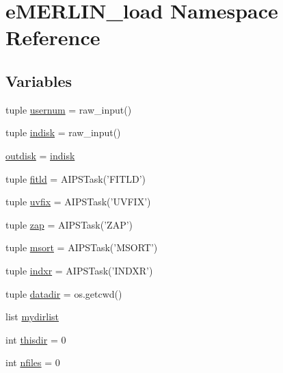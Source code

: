\hypertarget{namespacee_m_e_r_l_i_n__load}{\section{e\-M\-E\-R\-L\-I\-N\-\_\-load \-Namespace \-Reference}
\label{namespacee_m_e_r_l_i_n__load}
}
\subsection*{\-Variables}
\begin{DoxyCompactItemize}
\item 
tuple \hyperlink{namespacee_m_e_r_l_i_n__load_af02bbee7ea129998a2af5726d1838d88}{usernum} = raw\-\_\-input()
\item 
tuple \hyperlink{namespacee_m_e_r_l_i_n__load_af5dbb7c985275442e06db7e9c4d2ed57}{indisk} = raw\-\_\-input()
\item 
\hyperlink{namespacee_m_e_r_l_i_n__load_a1b1907c1f32abe6b155fca3b653b8150}{outdisk} = \hyperlink{namespacee_m_e_r_l_i_n__load_af5dbb7c985275442e06db7e9c4d2ed57}{indisk}
\item 
tuple \hyperlink{namespacee_m_e_r_l_i_n__load_ae0faabbb35af280be9b9329979f9e782}{fitld} = \-A\-I\-P\-S\-Task('\-F\-I\-T\-L\-D')
\item 
tuple \hyperlink{namespacee_m_e_r_l_i_n__load_a091bef4aa50a0022baf52ba2ecad1fa6}{uvfix} = \-A\-I\-P\-S\-Task('\-U\-V\-F\-I\-X')
\item 
tuple \hyperlink{namespacee_m_e_r_l_i_n__load_a15f04a2ce3db28802bc8636932032fe3}{zap} = \-A\-I\-P\-S\-Task('\-Z\-A\-P')
\item 
tuple \hyperlink{namespacee_m_e_r_l_i_n__load_afb84c32aea312e44c454e4a19e092400}{msort} = \-A\-I\-P\-S\-Task('\-M\-S\-O\-R\-T')
\item 
tuple \hyperlink{namespacee_m_e_r_l_i_n__load_a903f4b4390c6d8095ee9dd8dfc21f36a}{indxr} = \-A\-I\-P\-S\-Task('\-I\-N\-D\-X\-R')
\item 
tuple \hyperlink{namespacee_m_e_r_l_i_n__load_a12e27e0f750273e7f703b10d29bcf3ed}{datadir} = os.\-getcwd()
\item 
list \hyperlink{namespacee_m_e_r_l_i_n__load_a25eac8aebede2d2703c105ca1e0b09a2}{mydirlist}
\item 
int \hyperlink{namespacee_m_e_r_l_i_n__load_a9071ee4536dd6e3909ef0590d4e0620c}{thisdir} = 0
\item 
int \hyperlink{namespacee_m_e_r_l_i_n__load_a2ec20a600a1d5f0b51b5eddc67ab3d67}{nfiles} = 0
\item 

\end{DoxyCompactItemize}
